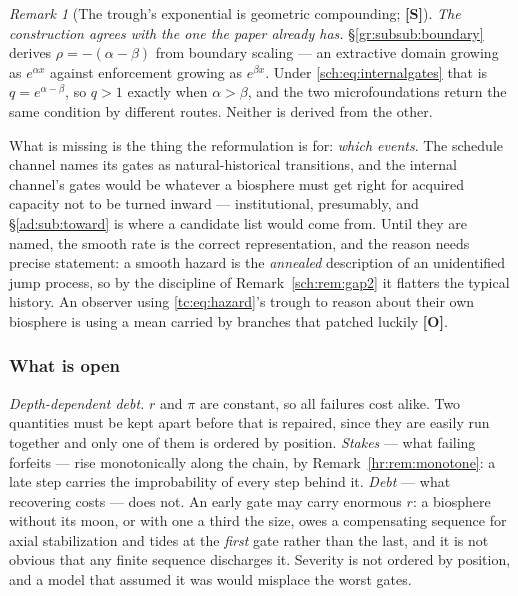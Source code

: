 \documentclass[11pt]{article}
\numberwithin{equation}{section}
\theoremstyle{plain}
\theoremstyle{definition}
\theoremstyle{remark}
\newtheorem{remark}[theorem]{Remark}
\begin{document}
\begin{remark}[The trough's exponential is geometric compounding;
\textbf{[S]}]
\emph{The construction agrees with the one the paper already has.}
\S\ref{gr:subsub:boundary} derives $\rho=-(\alpha-\beta)$ from boundary
scaling --- an extractive domain growing as $e^{\alpha x}$ against
enforcement growing as $e^{\beta x}$. Under \eqref{sch:eq:internalgates}
that is $q=e^{\alpha-\beta}$, so $q>1$ exactly when $\alpha>\beta$, and
the two microfoundations return the same condition by different routes.
Neither is derived from the other.
\end{remark}

What is missing is the thing the reformulation is for: \emph{which
events}. The schedule channel names its gates as natural-historical
transitions, and the internal channel's gates would be whatever a
biosphere must get right for acquired capacity not to be turned inward
--- institutional, presumably, and \S\ref{ad:sub:toward} is where a
candidate list would come from. Until they are named, the smooth rate is the correct representation, and the reason needs precise statement: a
smooth hazard is the \emph{annealed} description of an unidentified jump
process, so by the discipline of Remark~\ref{sch:rem:gap2} it flatters
the typical history. An observer using \eqref{tc:eq:hazard}'s trough to
reason about their own biosphere is using a mean carried by branches that
patched luckily \textbf{[O]}.

\subsubsection{What is open}\label{sch:subsub:open}

\emph{Depth-dependent debt.} $r$ and $\pi$ are constant, so all failures
cost alike. Two quantities must be kept apart before that is repaired,
since they are easily run together and only one of them is ordered by
position. \emph{Stakes} --- what failing forfeits --- rise monotonically
along the chain, by Remark~\ref{hr:rem:monotone}: a late step carries
the improbability of every step behind it. \emph{Debt} --- what
recovering costs --- does not. An early gate may carry enormous $r$: a
biosphere without its moon, or with one a third the size, owes a
compensating sequence for axial stabilization and tides at the
\emph{first} gate rather than the last, and it is not obvious that any
finite sequence discharges it. Severity is not ordered by position, and
a model that assumed it was would misplace the worst gates.
\end{document}
